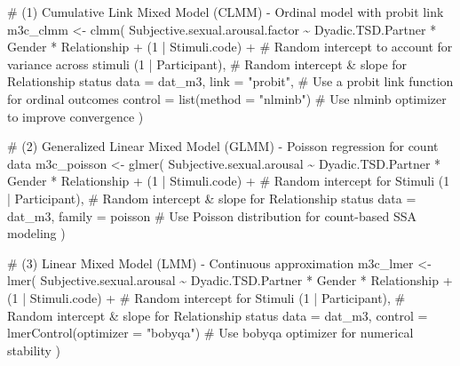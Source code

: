 \documentclass[
  bookmarksnumbered]{article}
\newenvironment{Shaded}{\begin{snugshade}}{\end{snugshade}}
\newcommand{\AttributeTok}[1]{\textcolor[rgb]{0.80,0.80,0.80}{#1}}
\newcommand{\CommentTok}[1]{\textcolor[rgb]{0.50,0.62,0.50}{#1}}
\newcommand{\DecValTok}[1]{\textcolor[rgb]{0.86,0.86,0.80}{#1}}
\newcommand{\FunctionTok}[1]{\textcolor[rgb]{0.94,0.94,0.56}{#1}}
\newcommand{\NormalTok}[1]{\textcolor[rgb]{0.80,0.80,0.80}{#1}}
\newcommand{\OtherTok}[1]{\textcolor[rgb]{0.94,0.94,0.56}{#1}}
\newcommand{\SpecialCharTok}[1]{\textcolor[rgb]{0.86,0.64,0.64}{#1}}
\newcommand{\StringTok}[1]{\textcolor[rgb]{0.80,0.58,0.58}{#1}}
\begin{document}
\begin{Shaded}
\begin{Highlighting}[]
\CommentTok{\# (1) Cumulative Link Mixed Model (CLMM) {-} Ordinal model with probit link}
\NormalTok{m3c\_clmm }\OtherTok{\textless{}{-}} \FunctionTok{clmm}\NormalTok{(}
\NormalTok{  Subjective.sexual.arousal.factor }\SpecialCharTok{\textasciitilde{}}\NormalTok{ Dyadic.TSD.Partner }\SpecialCharTok{*}\NormalTok{ Gender }\SpecialCharTok{*}\NormalTok{ Relationship }\SpecialCharTok{+}
\NormalTok{    (}\DecValTok{1} \SpecialCharTok{|}\NormalTok{ Stimuli.code) }\SpecialCharTok{+} \CommentTok{\# Random intercept to account for variance across stimuli}
\NormalTok{    (}\DecValTok{1} \SpecialCharTok{|}\NormalTok{ Participant), }\CommentTok{\# Random intercept \& slope for Relationship status}
  \AttributeTok{data =}\NormalTok{ dat\_m3,}
  \AttributeTok{link =} \StringTok{"probit"}\NormalTok{, }\CommentTok{\# Use a probit link function for ordinal outcomes}
  \AttributeTok{control =} \FunctionTok{list}\NormalTok{(}\AttributeTok{method =} \StringTok{"nlminb"}\NormalTok{) }\CommentTok{\# Use \textquotesingle{}nlminb\textquotesingle{} optimizer to improve convergence}
\NormalTok{)}

\CommentTok{\# (2) Generalized Linear Mixed Model (GLMM) {-} Poisson regression for count data}
\NormalTok{m3c\_poisson }\OtherTok{\textless{}{-}} \FunctionTok{glmer}\NormalTok{(}
\NormalTok{  Subjective.sexual.arousal }\SpecialCharTok{\textasciitilde{}}\NormalTok{ Dyadic.TSD.Partner }\SpecialCharTok{*}\NormalTok{ Gender }\SpecialCharTok{*}\NormalTok{ Relationship }\SpecialCharTok{+}
\NormalTok{    (}\DecValTok{1} \SpecialCharTok{|}\NormalTok{ Stimuli.code) }\SpecialCharTok{+} \CommentTok{\# Random intercept for Stimuli}
\NormalTok{    (}\DecValTok{1} \SpecialCharTok{|}\NormalTok{ Participant), }\CommentTok{\# Random intercept \& slope for Relationship status}
  \AttributeTok{data =}\NormalTok{ dat\_m3,}
  \AttributeTok{family =}\NormalTok{ poisson }\CommentTok{\# Use Poisson distribution for count{-}based SSA modeling}
\NormalTok{)}

\CommentTok{\# (3) Linear Mixed Model (LMM) {-} Continuous approximation}
\NormalTok{m3c\_lmer }\OtherTok{\textless{}{-}} \FunctionTok{lmer}\NormalTok{(}
\NormalTok{  Subjective.sexual.arousal }\SpecialCharTok{\textasciitilde{}}\NormalTok{ Dyadic.TSD.Partner }\SpecialCharTok{*}\NormalTok{ Gender }\SpecialCharTok{*}\NormalTok{ Relationship }\SpecialCharTok{+}
\NormalTok{    (}\DecValTok{1} \SpecialCharTok{|}\NormalTok{ Stimuli.code) }\SpecialCharTok{+} \CommentTok{\# Random intercept for Stimuli}
\NormalTok{    (}\DecValTok{1} \SpecialCharTok{|}\NormalTok{ Participant), }\CommentTok{\# Random intercept \& slope for Relationship status}
  \AttributeTok{data =}\NormalTok{ dat\_m3,}
  \AttributeTok{control =} \FunctionTok{lmerControl}\NormalTok{(}\AttributeTok{optimizer =} \StringTok{"bobyqa"}\NormalTok{) }\CommentTok{\# Use \textquotesingle{}bobyqa\textquotesingle{} optimizer for numerical stability}
\NormalTok{)}
\end{Highlighting}
\end{Shaded}
\end{document}

